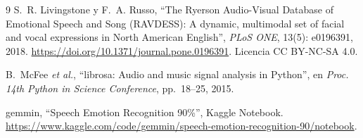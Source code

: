 \documentclass[11pt,a4paper]{article}
\begin{document}
\begin{thebibliography}{9}
S.~R. Livingstone y F.~A. Russo, ``The Ryerson Audio-Visual Database of Emotional Speech and Song
(RAVDESS): A dynamic, multimodal set of facial and vocal expressions in North American English'',
\emph{PLoS ONE}, 13(5): e0196391, 2018. \url{https://doi.org/10.1371/journal.pone.0196391}.
Licencia CC BY-NC-SA 4.0.

B.~McFee \emph{et al.}, ``librosa: Audio and music signal analysis in Python'', en \emph{Proc. 14th
Python in Science Conference}, pp.~18--25, 2015.

gemmin, ``Speech Emotion Recognition 90\%'', Kaggle Notebook.
\url{https://www.kaggle.com/code/gemmin/speech-emotion-recognition-90/notebook}.
\end{thebibliography}
\end{document}
